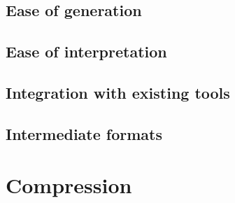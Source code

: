 \subsection{Ease of generation}
\subsection{Ease of interpretation}
\subsection{Integration with existing tools}
\subsection{Intermediate formats}

\section{Compression}

